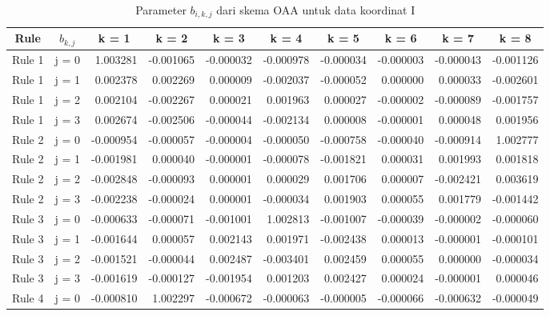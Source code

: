 {\begin{table}[htbp!]
    \centering
    \caption{Parameter $b_{i,k,j}$  dari skema OAA untuk data koordinat I}
    \label{tab:my_label}
    \begin{tabular}{llrrrrrrrr}
    \toprule
    \multicolumn{1}{c}{\textbf{Rule}} & \multicolumn{1}{c}{\boldmath{}\textbf{$b_{k,j}$}\unboldmath{}} & \multicolumn{1}{c}{\textbf{k = 1}} & \multicolumn{1}{c}{\textbf{k = 2}} & \multicolumn{1}{c}{\textbf{k = 3}} & \multicolumn{1}{c}{\textbf{k = 4}} & \multicolumn{1}{c}{\textbf{k = 5}} & \multicolumn{1}{c}{\textbf{k = 6}} & \multicolumn{1}{c}{\textbf{k = 7}} & \multicolumn{1}{c}{\textbf{k = 8}} \\
    \midrule
    Rule 1 & j = 0 & 1.003281 & -0.001065 & -0.000032 & -0.000978 & -0.000034 & -0.000003 & -0.000043 & -0.001126 \\
    Rule 1 & j = 1 & 0.002378 & 0.002269 & 0.000009 & -0.002037 & -0.000052 & 0.000000 & 0.000033 & -0.002601 \\
    Rule 1 & j = 2 & 0.002104 & -0.002267 & 0.000021 & 0.001963 & 0.000027 & -0.000002 & -0.000089 & -0.001757 \\
    Rule 1 & j = 3 & 0.002674 & -0.002506 & -0.000044 & -0.002134 & 0.000008 & -0.000001 & 0.000048 & 0.001956 \\
    Rule 2 & j = 0 & -0.000954 & -0.000057 & -0.000004 & -0.000050 & -0.000758 & -0.000040 & -0.000914 & 1.002777 \\
    Rule 2 & j = 1 & -0.001981 & 0.000040 & -0.000001 & -0.000078 & -0.001821 & 0.000031 & 0.001993 & 0.001818 \\
    Rule 2 & j = 2 & -0.002848 & -0.000093 & 0.000001 & 0.000029 & 0.001706 & 0.000007 & -0.002421 & 0.003619 \\
    Rule 2 & j = 3 & -0.002238 & -0.000024 & 0.000001 & -0.000034 & 0.001903 & 0.000055 & 0.001779 & -0.001442 \\
    Rule 3 & j = 0 & -0.000633 & -0.000071 & -0.001001 & 1.002813 & -0.001007 & -0.000039 & -0.000002 & -0.000060 \\
    Rule 3 & j = 1 & -0.001644 & 0.000057 & 0.002143 & 0.001971 & -0.002438 & 0.000013 & -0.000001 & -0.000101 \\
    Rule 3 & j = 2 & -0.001521 & -0.000044 & 0.002487 & -0.003401 & 0.002459 & 0.000055 & 0.000000 & -0.000034 \\
    Rule 3 & j = 3 & -0.001619 & -0.000127 & -0.001954 & 0.001203 & 0.002427 & 0.000024 & -0.000001 & 0.000046 \\
    Rule 4 & j = 0 & -0.000810 & 1.002297 & -0.000672 & -0.000063 & -0.000005 & -0.000066 & -0.000632 & -0.000049 \\

\end{tabular}
\end{table}}
